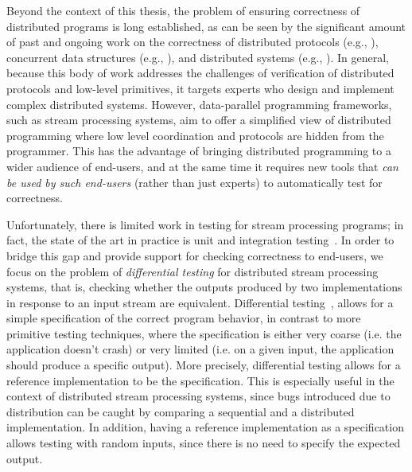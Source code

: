 Beyond the context of this thesis, the problem of ensuring correctness of distributed programs is long established, as can be seen by the significant amount of past and ongoing work on the correctness of distributed protocols (e.g., \cite{chand2016formal,abdulla2014optimal,padon2016ivy}), concurrent data structures (e.g., \cite{herlihy1990linearizability,burckhardt2014replicated}),
and distributed systems (e.g., \cite{ozkan2018randomized,wilcox2015verdi,hawblitzel2015ironfleet}).
In general, because this body of work addresses the challenges of verification of distributed protocols and low-level primitives, it targets experts who design and implement complex distributed systems.
However, data-parallel programming frameworks, such as stream processing systems, aim to offer a simplified view of distributed programming where low level coordination and protocols are hidden from the programmer. This has the advantage of bringing distributed programming to a wider audience of end-users, and at the same time it requires new tools that \emph{can be used by such end-users} (rather than just experts) to automatically test for correctness.

Unfortunately, there is limited work in testing for stream processing programs; in fact, the state of the art in practice is unit and integration testing~\cite{vianna2019exploratory}.
In order to bridge this gap and provide support for checking correctness to end-users,
we focus on the problem of \emph{differential  testing} for distributed stream processing systems, that is, checking whether the outputs produced by two implementations in response to an input stream are equivalent.
Differential testing~\cite{mckeeman1998differential,groce2007randomized,evans2007differential},
allows for a simple specification of the correct program behavior, in contrast to more primitive testing techniques, where
the specification is either very coarse (i.e. the application doesn't crash) or very limited (i.e. on a given input, the application should produce a specific output).
More precisely, differential testing allows for a reference implementation to be the specification. This is especially useful in the context of distributed stream processing systems, since bugs introduced due to distribution can be caught by comparing a sequential and a distributed implementation. In addition, having a reference implementation as a specification allows testing with random inputs, since there is no need to specify the expected output.

